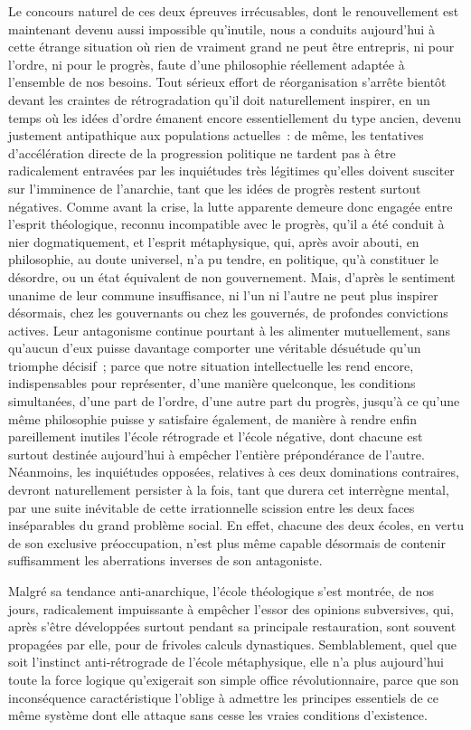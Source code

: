 \documentclass[french,twoside]{book} %
\begin{document}
Le concours naturel de ces deux épreuves irrécusables, dont le renouvellement est maintenant devenu aussi impossible qu’inutile, nous a conduits aujourd’hui à cette étrange situation où rien de vraiment grand ne peut être entrepris, ni pour l’ordre, ni pour le progrès, faute d’une philosophie réellement adaptée à l’ensemble de nos besoins. Tout sérieux effort de réorganisation s’arrête bientôt devant les craintes de rétrogradation qu’il doit naturellement inspirer, en un temps où les idées d’ordre émanent encore essentiellement du type ancien, devenu justement antipathique aux populations actuelles : de même, les tentatives d’accélération directe de la progression politique ne tardent pas à être radicalement entravées par les inquiétudes très légitimes qu’elles doivent susciter sur l’imminence de l’anarchie, tant que les idées de progrès restent surtout négatives. Comme avant la crise, la lutte apparente demeure donc engagée entre l’esprit théologique, reconnu incompatible avec le progrès, qu’il a été conduit à nier dogmatiquement, et l’esprit métaphysique, qui, après avoir abouti, en philosophie, au doute universel, n’a pu tendre, en politique, qu’à constituer le désordre, ou un état équivalent de non gouvernement. Mais, d’après le sentiment unanime de leur commune insuffisance, ni l’un ni l’autre ne peut plus inspirer désormais, chez les gouvernants ou chez les gouvernés, de profondes convictions actives. Leur antagonisme continue pourtant à les alimenter mutuellement, sans qu’aucun d’eux puisse davantage comporter une véritable désuétude qu’un triomphe décisif ; parce que notre situation intellectuelle les rend encore, indispensables pour représenter, d’une manière quelconque, les conditions simultanées, d’une part de l’ordre, d’une autre part du progrès, jusqu’à ce qu’une même philosophie puisse y satisfaire également, de manière à rendre enfin pareillement inutiles l’école rétrograde et l’école négative, dont chacune est surtout destinée aujourd’hui à empêcher l’entière prépondérance de l’autre. Néanmoins, les inquiétudes opposées, relatives à ces deux dominations contraires, devront naturellement persister à la fois, tant que durera cet interrègne mental, par une suite inévitable de cette irrationnelle scission entre les deux faces inséparables du grand problème social. En effet, chacune des deux écoles, en vertu de son exclusive préoccupation, n’est plus même capable désormais de contenir suffisamment les aberrations inverses de son antagoniste.\par
Malgré sa tendance anti-anarchique, l’école théologique s’est montrée, de nos jours, radicalement impuissante à empêcher l’essor des opinions subversives, qui, après s’être développées surtout pendant sa principale restauration, sont souvent propagées par elle, pour de frivoles calculs dynastiques. Semblablement, quel que soit l’instinct anti-rétrograde de l’école métaphysique, elle n’a plus aujourd’hui toute la force logique qu’exigerait son simple office révolutionnaire, parce que son inconséquence caractéristique l’oblige à admettre les principes essentiels de ce même système dont elle attaque sans cesse les vraies conditions d’existence.\par
\end{document}
